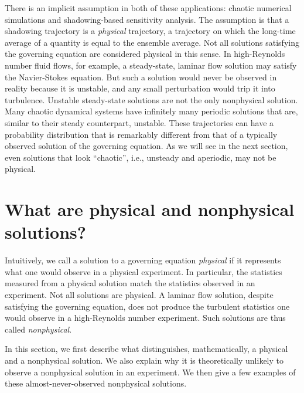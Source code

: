 \documentclass[preprint,12pt]{elsarticle}
\begin{document}
There is an implicit assumption in both of these applications: chaotic numerical simulations and shadowing-based sensitivity analysis.  The assumption is that a shadowing trajectory is a \emph{physical} trajectory, a trajectory on which
the long-time average of a quantity is equal to the ensemble average.
Not all solutions satisfying the governing equation are considered physical in this sense.  In high-Reynolds number fluid flows, for example, a steady-state, laminar flow solution may satisfy the Navier-Stokes equation. But such a solution would never be observed in reality because it is unstable, and any small perturbation
would trip it into turbulence. Unstable steady-state solutions are not the only
nonphysical solution. Many chaotic dynamical systems have infinitely many periodic
solutions that are, similar to their steady counterpart, unstable. These trajectories can have a probability distribution that is remarkably different from that of a typically observed solution of the governing equation.     
As we will see
in the next section, even solutions that look ``chaotic'', i.e., unsteady and aperiodic, may not be physical. 

\section{What are physical and nonphysical solutions?}
\label{sec:nonphysical}
Intuitively, we call a solution to a governing equation \emph{physical} if
it represents what one would observe in a physical experiment.  In particular, the statistics measured from a physical solution match the statistics observed
in an experiment.   Not all solutions are physical.  A laminar flow
solution, despite satisfying the governing equation, does not produce the
turbulent statistics one would observe in a high-Reynolds number experiment. Such solutions are thus called \emph{nonphysical}.

In this section, we first describe what distinguishes, mathematically, a physical
and a nonphysical solution.  We also explain why it is theoretically unlikely
to observe a nonphysical solution in an experiment.  We then give a few
examples of these almost-never-observed nonphysical solutions.
\end{document}
